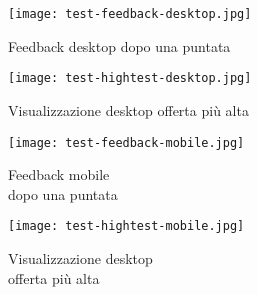 \begin{figure}[H]
	\centering
	\texttt{[image: test-feedback-desktop.jpg]}
	\caption{Feedback desktop dopo una puntata}
	\label{fig:testFeedbackDesktop}
\end{figure}
\begin{figure}[H]
	\centering
	\texttt{[image: test-hightest-desktop.jpg]}
	\caption{Visualizzazione desktop offerta più alta}
	\label{fig:testHightestDesktop}
\end{figure}

\begin{figure}[H]
	\centering
	\begin{minipage}[b]{0.48\textwidth}
		\centering
		\texttt{[image: test-feedback-mobile.jpg]}
		\caption{Feedback mobile\\dopo una puntata}
		\label{fig:testFeedbackMobile}
	\end{minipage}
	\begin{minipage}[b]{0.48\textwidth}
		\centering
		\texttt{[image: test-hightest-mobile.jpg]}
		\caption{Visualizzazione desktop\\offerta più alta}
	\label{fig:testHightestMobile}
	\end{minipage}	
\end{figure}
